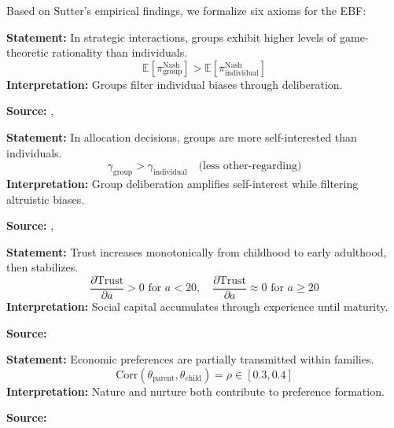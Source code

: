 Based on Sutter's empirical findings, we formalize six axioms for the EBF:

\begin{tcolorbox}[colback=gray!5!white, colframe=gray!75!black,
    title=Axiom SU-1: Group Rationality Premium]
\textbf{Statement:} In strategic interactions, groups exhibit higher levels of game-theoretic rationality than individuals.
\begin{equation}
\mathbb{E}[\pi_{\text{group}}^{\text{Nash}}] > \mathbb{E}[\pi_{\text{individual}}^{\text{Nash}}]
\end{equation}
\textbf{Interpretation:} Groups filter individual biases through deliberation.

\textbf{Source:} \citet{charness2012groups}, \citet{kocher2005decision}
\end{tcolorbox}

\begin{tcolorbox}[colback=gray!5!white, colframe=gray!75!black,
    title=Axiom SU-2: Group Selfishness Premium]
\textbf{Statement:} In allocation decisions, groups are more self-interested than individuals.
\begin{equation}
\gamma_{\text{group}} > \gamma_{\text{individual}} \quad \text{(less other-regarding)}
\end{equation}
\textbf{Interpretation:} Group deliberation amplifies self-interest while filtering altruistic biases.

\textbf{Source:} \citet{luhan2009polarization}, \citet{kugler2007trust}
\end{tcolorbox}

\begin{tcolorbox}[colback=gray!5!white, colframe=gray!75!black,
    title=Axiom SU-3: Trust Development]
\textbf{Statement:} Trust increases monotonically from childhood to early adulthood, then stabilizes.
\begin{equation}
\frac{\partial \text{Trust}}{\partial a} > 0 \text{ for } a < 20, \quad \frac{\partial \text{Trust}}{\partial a} \approx 0 \text{ for } a \geq 20
\end{equation}
\textbf{Interpretation:} Social capital accumulates through experience until maturity.

\textbf{Source:} \citet{sutter2007trust}
\end{tcolorbox}

\begin{tcolorbox}[colback=gray!5!white, colframe=gray!75!black,
    title=Axiom SU-4: Preference Heritability]
\textbf{Statement:} Economic preferences are partially transmitted within families.
\begin{equation}
\text{Corr}(\theta_{\text{parent}}, \theta_{\text{child}}) = \rho \in [0.3, 0.4]
\end{equation}
\textbf{Interpretation:} Nature and nurture both contribute to preference formation.

\textbf{Source:} \citet{chowdhury2022preferences}
\end{tcolorbox}


